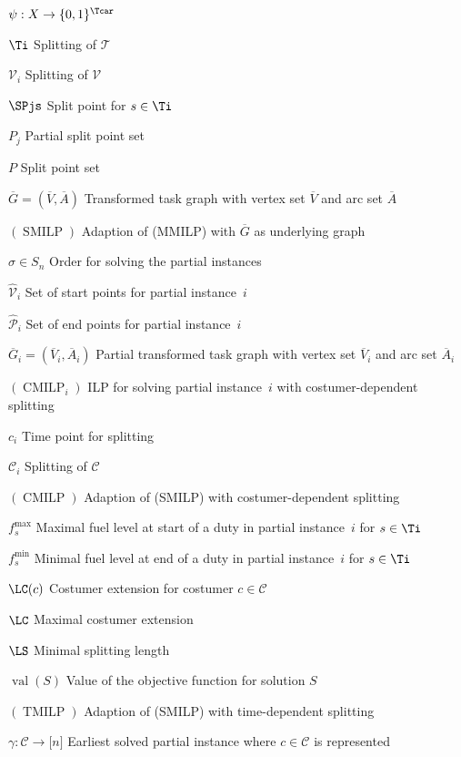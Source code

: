 \begin{labeling}{$\psi:X\to\{0,1\}^{\Tcar}$}
	\item[$\Ti$]{Splitting of $\mathcal{T}$}
	\item[$\mathcal{V}_i$]{Splitting of $\mathcal{V}$}
	\item[$\SPjs$]{Split point for $s\in\Ti$}
	\item[$P_j$]{Partial split point set}
	\item[$P$]{Split point set}
	\item[$\overline{G}=\left(\overline{V},\overline{A}\right)$]{Transformed task graph with vertex set $\overline{V}$ and arc set $\overline{A}$}
	\item[$(\operatorname{SMILP})$]{Adaption of (MMILP) with $\overline{G}$ as underlying graph}
	\item[$\sigma\in S_n$]{Order for solving the partial instances}
	\item[$\hat{\mathcal{V}}_i$]{Set of start points for partial instance~$i$}
	\item[$\hat{\mathcal{P}}_i$]{Set of end points for partial instance~$i$}
	\item[$\overline{G}_i=\left(\overline{V}_i,\overline{A}_i\right)$]{Partial transformed task graph with vertex set $\overline{V}_i$ and arc set $\overline{A}_i$}
	\item[$(\operatorname{CMILP}_i)$]{ILP for solving partial instance~$i$ with costumer-dependent splitting}
	\item[$c_i$]{Time point for splitting}
	\item[$\mathcal{C}_i$]{Splitting of $\mathcal{C}$}
	\item[$(\operatorname{CMILP})$]{Adaption of (SMILP) with costumer-dependent splitting}
	\item[$f^{\max}_s$]{Maximal fuel level at start of a duty in partial instance~$i$ for $s\in\Ti$}
	\item[$f^{\min}_s$]{Minimal fuel level at end of a duty in partial instance~$i$ for $s\in\Ti$}
	\item[$\LC(c)$]{Costumer extension for costumer $c\in\mathcal{C}$}
	\item[$\LC$]{Maximal costumer extension}
	\item[$\LS$]{Minimal splitting length}
	\item[$\operatorname{val}(S)$]{Value of the objective function for solution $S$}
	\item[$(\operatorname{TMILP})$]{Adaption of (SMILP) with time-dependent splitting}
	\item[$\gamma:\mathcal{C}\to\lbrack n\rbrack$]{Earliest solved partial instance where $c\in\mathcal{C}$ is represented}

\end{labeling}
